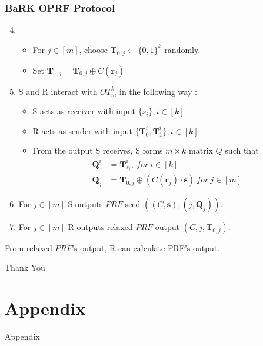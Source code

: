 \documentclass[hyperref={pdfpagelabels=false}]{beamer}
\theoremstyle{remark}
\begin{document}
\begin{frame}
\frametitle{BaRK OPRF Protocol}
\begin{enumerate}
\setcounter{enumi}{3}
\item[] \begin{itemize}
\item For $j \in [m]$, choose $\mathbf{T}_{0,j} \leftarrow \{0,1\}^k$ randomly.\pause
\item Set $\mathbf{T}_{1,j} = \mathbf{T}_{0,j} \oplus C(\mathbf{r}_j)$\pause
\end{itemize}
\item S and R interact with $OT_m^k$ in the following way :\pause
\begin{itemize}
\item S acts as receiver with input $\{s_i\}, i \in [k]$\pause
\item R acts as sender with input $\{\mathbf{T}_0^i,\mathbf{T}_1^i\}, i \in [k]$\pause
\item From the output S receives, S forms $m\times k$ matrix $Q$ such that 
\begin{align*}
\mathbf{Q}^i &= \mathbf{T}_{s_i}^i, \ for\  i \in [k] \\
\mathbf{Q}_j &= \mathbf{T}_{0,j} \oplus (C(\mathbf{r}_j) \cdot \mathbf{s}) \ for \ j \in [m]
\end{align*}
\end{itemize}\pause
\item For $j \in [m]$ S outputs $PRF$ seed $((C,\mathbf{s}),(j,\mathbf{Q}_j))$.\pause
\item For $j \in [m]$ R outputs relaxed-$PRF$ output $(C,j,\mathbf{T}_{0,j})$.\pause
\end{enumerate}
From relaxed-$PRF$'s output, R can calculate PRF's output.
\end{frame}


\begin{frame}
\begin{center}
\Huge Thank You \smiley{}
\end{center}
\end{frame}


\section{Appendix}
\begin{frame}
\begin{center}
\Huge Appendix
\end{center}
\end{frame}
\end{document}
